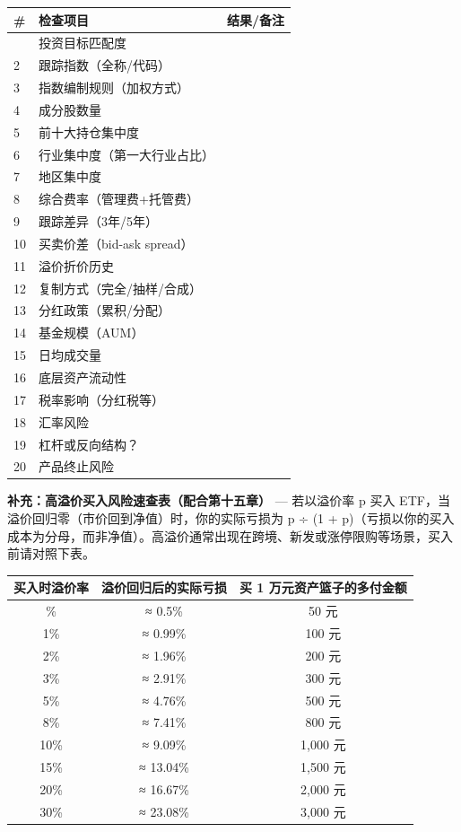 \documentclass[a4paper,11pt,oneside,fontset=none,UTF8,zihao=-4]{ctexbook}
\begin{document}
\begin{longtable}[]{@{}lll@{}}
\toprule\noalign{}\rowcolor{dh-pink!25}
\# & 检查项目 & 结果/备注 \\
\midrule\noalign{}
\endhead
\bottomrule\noalign{}
\endlastfoot
1 & 投资目标匹配度 & \\
2 & 跟踪指数（全称/代码） & \\
3 & 指数编制规则（加权方式） & \\
4 & 成分股数量 & \\
5 & 前十大持仓集中度 & \\
6 & 行业集中度（第一大行业占比） & \\
7 & 地区集中度 & \\
8 & 综合费率（管理费+托管费） & \\
9 & 跟踪差异（3年/5年） & \\
10 & 买卖价差（bid-ask spread） & \\
11 & 溢价折价历史 & \\
12 & 复制方式（完全/抽样/合成） & \\
13 & 分红政策（累积/分配） & \\
14 & 基金规模（AUM） & \\
15 & 日均成交量 & \\
16 & 底层资产流动性 & \\
17 & 税率影响（分红税等） & \\
18 & 汇率风险 & \\
19 & 杠杆或反向结构？ & \\
20 & 产品终止风险 & \\
\end{longtable}

\begin{dhquote}
\textbf{补充：高溢价买入风险速查表（配合第十五章）} --- 若以溢价率 p
买入 ETF，当溢价回归零（市价回到净值）时，你的实际亏损为 p ÷ (1 +
p)（亏损以你的买入成本为分母，而非净值）。高溢价通常出现在跨境、新发或涨停限购等场景，买入前请对照下表。
\end{dhquote}

\begin{longtable}[]{@{}ccc@{}}
\toprule\noalign{}\rowcolor{dh-pink!25}
买入时溢价率 & 溢价回归后的实际亏损 & 买 1 万元资产篮子的多付金额 \\
\midrule\noalign{}
\endhead
\bottomrule\noalign{}
\endlastfoot
0.5\% & ≈ 0.5\% & 50 元 \\
1\% & ≈ 0.99\% & 100 元 \\
2\% & ≈ 1.96\% & 200 元 \\
3\% & ≈ 2.91\% & 300 元 \\
5\% & ≈ 4.76\% & 500 元 \\
8\% & ≈ 7.41\% & 800 元 \\
10\% & ≈ 9.09\% & 1,000 元 \\
15\% & ≈ 13.04\% & 1,500 元 \\
20\% & ≈ 16.67\% & 2,000 元 \\
30\% & ≈ 23.08\% & 3,000 元 \\
\end{longtable}
\end{document}
